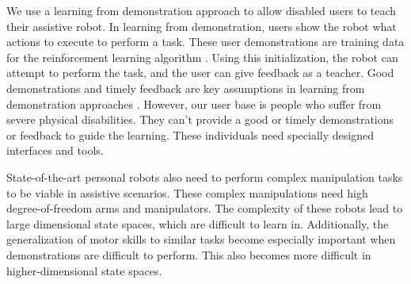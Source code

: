 \documentclass{sig-alternate-2013}
\begin{document}
We use a learning from demonstration approach to allow disabled users to teach their assistive robot. In learning from demonstration, users show the robot what actions to execute to perform a task. These user demonstrations are training data for the reinforcement learning algorithm \cite{Bagnell_2013_7451}. Using this initialization, the robot can attempt to perform the task, and the user can give feedback as a teacher. Good demonstrations and timely feedback are key assumptions in learning from demonstration approaches \cite{Argall:2009:SRL:1523530.1524008}. However, our user base is people who suffer from severe physical disabilities. They can't provide a good or timely demonstrations or feedback to guide the learning. These individuals need specially designed interfaces and tools.




State-of-the-art personal robots also need to perform complex manipulation tasks to be viable in assistive scenarios. These complex manipulations need high degree-of-freedom arms and manipulators. The complexity of these robots lead to large dimensional state spaces, which are difficult to learn in. Additionally, the generalization of motor skills to similar tasks become especially important when demonstrations are difficult to perform. This also becomes more difficult in higher-dimensional state spaces. 

\end{document}
